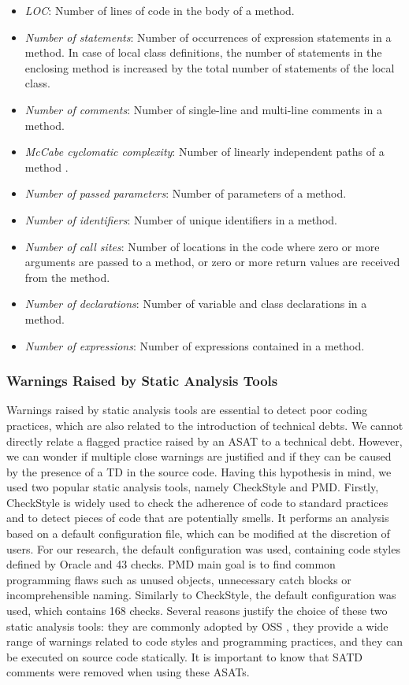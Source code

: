 \begin{itemize}
\item \textit{LOC}: Number of lines of code in the body of a method. %
\item \textit{Number of statements}: Number of occurrences of expression statements in a method. In case of local class definitions, the number of statements in the enclosing method is increased by the total number of statements of the local class.
\item \textit{Number of comments}: Number of single-line and multi-line comments in a method.
\item \textit{McCabe cyclomatic complexity}: Number of linearly independent paths of a method \citep{mccabe90}.
\item \textit{Number of passed parameters}: Number of parameters of a method.
\item \textit{Number of identifiers}: Number of unique identifiers in a method.
\item \textit{Number of call sites}: Number of locations in the code where zero or more arguments are passed to a method, or zero or more return values are received from the method.
\item \textit{Number of declarations}: Number of variable and class declarations in a method.
\item \textit{Number of expressions}: Number of expressions contained in a method.
\end{itemize}

\subsubsection{Warnings Raised by Static Analysis Tools}

Warnings raised by static analysis tools are essential to detect poor coding practices, which are also related to the introduction of technical debts. We cannot directly relate a flagged practice raised by an ASAT to a technical debt. However, we can wonder if multiple close warnings are justified and if they can be caused by the presence of a \ac{TD} in the source code. Having this hypothesis in mind, we used two popular static analysis tools, namely CheckStyle and PMD. Firstly, CheckStyle \citep{checkstyle} is widely used to check the adherence of code to standard practices and to detect pieces of code that are potentially smells. It performs an analysis based on a default configuration file, which can be modified at the discretion of users. For our research, the default configuration was used, containing code styles defined by Oracle and 43 checks. PMD \citep{pmd} main goal is to find common programming flaws such as unused objects, unnecessary catch blocks or incomprehensible naming. Similarly to CheckStyle, the default configuration was used, which contains 168 checks. Several reasons justify the choice of these two static analysis tools: they are commonly adopted by \ac{OSS} \citep{BellerBMZ16}, they provide a wide range of warnings related to code styles and programming practices, and they can be executed on source code statically. It is important to know that \ac{SATD} comments were removed when using these ASATs.

